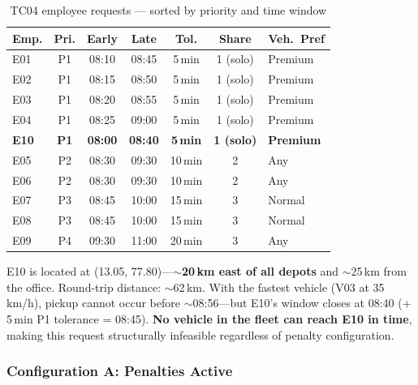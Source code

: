 \documentclass[11pt,a4paper]{article}
\begin{document}
\begin{table}[H]
\centering
\caption{TC04 employee requests --- sorted by priority and time window}
\label{tab:tc04-requests}
\small
\begin{tabular}{lcccccl}
\toprule
\textbf{Emp.} & \textbf{Pri.} & \textbf{Early} & \textbf{Late} & \textbf{Tol.} & \textbf{Share} & \textbf{Veh.\ Pref} \\
\midrule
\rowcolor{rowalt}
E01 & P1 & 08:10 & 08:45 & 5\,min & 1 (solo) & Premium \\
E02 & P1 & 08:15 & 08:50 & 5\,min & 1 (solo) & Premium \\
\rowcolor{rowalt}
E03 & P1 & 08:20 & 08:55 & 5\,min & 1 (solo) & Premium \\
E04 & P1 & 08:25 & 09:00 & 5\,min & 1 (solo) & Premium \\
\rowcolor{rowalt}
\textbf{E10} & \textbf{P1} & \textbf{08:00} & \textbf{08:40} & \textbf{5\,min} & \textbf{1 (solo)} & \textbf{Premium} \\
E05 & P2 & 08:30 & 09:30 & 10\,min & 2 & Any \\
\rowcolor{rowalt}
E06 & P2 & 08:30 & 09:30 & 10\,min & 2 & Any \\
E07 & P3 & 08:45 & 10:00 & 15\,min & 3 & Normal \\
\rowcolor{rowalt}
E08 & P3 & 08:45 & 10:00 & 15\,min & 3 & Normal \\
E09 & P4 & 09:30 & 11:00 & 20\,min & 3 & Any \\
\bottomrule
\end{tabular}
\end{table}

\begin{warnbox}
E10 is located at (13.05, 77.80)---\textbf{$\sim$20\,km east of all depots} and $\sim$25\,km from the office. Round-trip distance: $\sim$62\,km. With the fastest vehicle (V03 at 35\,km/h), pickup cannot occur before $\sim$08:56---but E10's window closes at 08:40 (+ 5\,min P1 tolerance = 08:45). \textbf{No vehicle in the fleet can reach E10 in time}, making this request structurally infeasible regardless of penalty configuration.
\end{warnbox}

\subsubsection{Configuration A: Penalties Active}
\end{document}
